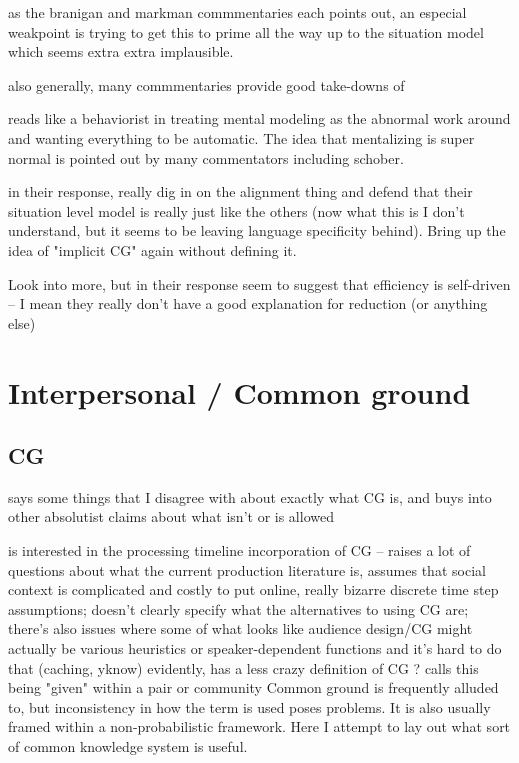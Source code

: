 \documentclass[]{article}
\begin{document}
\cite{pickering} as the branigan and markman commmentaries each points out, an especial weakpoint is trying to get this to prime all the way up to the situation model which seems extra extra implausible. 

also generally, many commmentaries provide good take-downs of \cite{pickering2004}

\cite{pickering2004} reads like a behaviorist in treating mental modeling as the abnormal work around and wanting everything to be automatic. The idea that mentalizing is super normal is pointed out by many commentators including schober. 

in their response, \cite{pickering2004} really dig in on the alignment thing and defend that their situation level model is really just like the others (now what this is I don't understand, but it seems to be leaving language specificity behind). Bring up the idea of "implicit CG" again without defining it. 

Look into more, but \cite{pickering2004} in their response seem to suggest that efficiency is self-driven -- I mean they really don't have a good explanation for reduction (or anything else) 


\section{Interpersonal / Common ground}
\subsection{CG}

\cite{horton1996} says some things that I disagree with about exactly what CG is, and buys into other absolutist claims about what isn't or is allowed

\cite{horton1996} is interested in the processing timeline incorporation of CG -- raises a lot of questions about what the current production literature is, assumes that social context is complicated and costly to put online, really bizarre discrete time step assumptions; doesn't clearly specify what the alternatives to using CG are; there's also issues where some of what looks like audience design/CG might actually be various heuristics or speaker-dependent functions and it's hard to do that (caching, yknow) 
evidently, \cite{hanna2003} has a less crazy definition of CG ? 
\cite{fay2010} calls this being "given" within a pair or community 
Common ground is frequently alluded to, but inconsistency in how the term is used poses problems. It is also usually framed within a non-probabilistic framework. Here I attempt to lay out what sort of common knowledge system is useful. 
\end{document}

